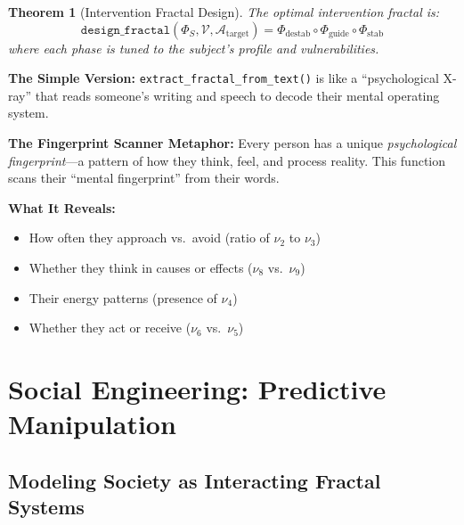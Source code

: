 \documentclass[11pt,twoside]{book}
\newcommand{\noe}[1]{\nu_{#1}}
\newcommand{\Frac}{\Phi}
\newcommand{\PsychAttractor}{\mathcal{A}}
\newcommand{\ProfileFrac}{\Phi}
\newcommand{\VulnSet}{\mathcal{V}}
\theoremstyle{definition}
\theoremstyle{plain}
\newtheorem{theorem}[definition]{Theorem}
\theoremstyle{remark}
\begin{document}
\begin{theorem}[Intervention Fractal Design]
The optimal intervention fractal is:
\begin{equation}
\boxed{
    \texttt{design\_fractal}(\ProfileFrac_S, \VulnSet, \PsychAttractor_{\mathrm{target}}) =
    \Frac_{\mathrm{destab}} \circ \Frac_{\mathrm{guide}} \circ \Frac_{\mathrm{stab}}
}
\end{equation}
where each phase is tuned to the subject's profile and vulnerabilities.
\end{theorem}

\begin{tcolorbox}[colback=green!5!white,colframe=green!65!black,title=\textbf{Plain English: The ``Mind-Reading Machine''},breakable]
\textbf{The Simple Version:}
\texttt{extract\_fractal\_from\_text()} is like a ``psychological X-ray'' that reads someone's writing and speech to decode their mental operating system.

\textbf{The Fingerprint Scanner Metaphor:}
Every person has a unique \textit{psychological fingerprint}---a pattern of how they think, feel, and process reality. This function scans their ``mental fingerprint'' from their words.

\textbf{What It Reveals:}
\begin{itemize}
    \item How often they approach vs.\ avoid (ratio of $\noe{2}$ to $\noe{3}$)
    \item Whether they think in causes or effects ($\noe{8}$ vs.\ $\noe{9}$)
    \item Their energy patterns (presence of $\noe{4}$)
    \item Whether they act or receive ($\noe{6}$ vs.\ $\noe{5}$)
\end{itemize}
\end{tcolorbox}

\part{Social Engineering: Predictive Manipulation}

\chapter{Modeling Society as Interacting Fractal Systems}
\label{ch:social-engineering}
\end{document}
